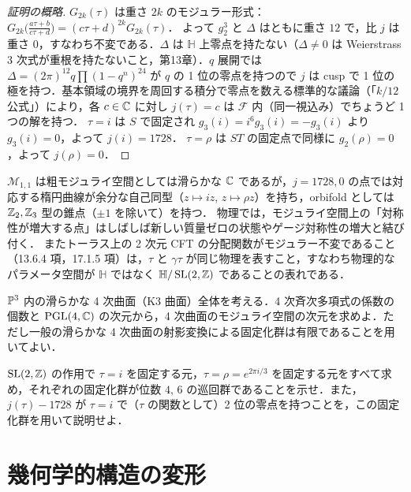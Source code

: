 \begin{proof}[証明の概略]
$G_{2k}(\tau)$ は重さ $2k$ のモジュラー形式：$G_{2k}\bigl(\tfrac{a\tau+b}{c\tau+d}\bigr)=(c\tau+d)^{2k}G_{2k}(\tau)$．
よって $g_2^3$ と $\Delta$ はともに重さ $12$ で，比 $j$ は重さ $0$，すなわち不変である．$\Delta$ は $\mathbb{H}$ 上零点を持たない（$\Delta\ne0$ は Weierstrass 3 次式が重根を持たないこと，第13章）．$q$ 展開では $\Delta=(2\pi)^{12}q\prod(1-q^n)^{24}$ が $q$ の 1 位の零点を持つので $j$ は cusp で 1 位の極を持つ．基本領域の境界を周回する積分で零点を数える標準的な議論（「$k/12$ 公式」）により，各 $c\in\mathbb{C}$ に対し $j(\tau)=c$ は $\mathcal{F}$ 内（同一視込み）でちょうど 1 つの解を持つ．
$\tau=i$ は $S$ で固定され $g_3(i)=i^{6}g_3(i)=-g_3(i)$ より $g_3(i)=0$，よって $j(i)=1728$．
$\tau=\rho$ は $ST$ の固定点で同様に $g_2(\rho)=0$，よって $j(\rho)=0$．
\end{proof}

\begin{physbox}[モジュライ空間の特異点]
$\mathcal{M}_{1,1}$ は粗モジュライ空間としては滑らかな $\mathbb{C}$ であるが，$j=1728,0$ の点では対応する楕円曲線が余分な自己同型（$z\mapsto iz$, $z\mapsto\rho z$）を持ち，orbifold としては $\mathbb{Z}_2,\mathbb{Z}_3$ 型の錐点（$\pm1$ を除いて）を持つ．
物理では，モジュライ空間上の「対称性が増大する点」はしばしば新しい質量ゼロの状態やゲージ対称性の増大と結び付く．
またトーラス上の 2 次元 CFT の分配関数がモジュラー不変であること（13.6.4 項，17.1.5 項）は，$\tau$ と $\gamma\tau$ が同じ物理を表すこと，すなわち物理的なパラメータ空間が $\mathbb{H}$ ではなく $\mathbb{H}/\operatorname{SL}(2,\mathbb{Z})$ であることの表れである．
\end{physbox}

$\mathbb{P}^3$ 内の滑らかな 4 次曲面（K3 曲面）全体を考える．4 次斉次多項式の係数の個数と $\operatorname{PGL}(4,\mathbb{C})$ の次元から，4 次曲面のモジュライ空間の次元を求めよ．ただし一般の滑らかな 4 次曲面の射影変換による固定化群は有限であることを用いてよい．

$\operatorname{SL}(2,\mathbb{Z})$ の作用で $\tau=i$ を固定する元，$\tau=\rho=e^{2\pi i/3}$ を固定する元をすべて求め，それぞれの固定化群が位数 $4$, $6$ の巡回群であることを示せ．また，$j(\tau)-1728$ が $\tau=i$ で（$\tau$ の関数として）2 位の零点を持つことを，この固定化群を用いて説明せよ．

\section{幾何学的構造の変形}


